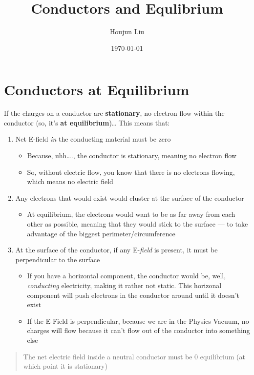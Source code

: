 \documentclass[letterpaper]{article}
\author{Houjun Liu}
\date{\today}
\title{Conductors and Equlibrium}
\renewcommand{\tableofcontents}{}
\begin{document}
\tableofcontents



\section{Conductors at Equilibrium}
\label{sec:orga47eebb}
If the charges on a conductor are \textbf{stationary}, no electron flow within
the conductor (so, it's \textbf{at equilibrium})\ldots{} This means that:

\begin{enumerate}
\item Net E-field \emph{in} the conducting material must be zero

\begin{itemize}
\item Because, uhh\ldots{}., the conductor is stationary, meaning no electron
flow
\item So, without electric flow, you know that there is no electrons
flowing, which means no electric field
\end{itemize}

\item Any electrons that would exist would cluster at the surface of the
conductor

\begin{itemize}
\item At equilibrium, the electrons would want to be as far away from
each other as possible, meaning that they would stick to the
surface --- to take advantage of the biggest
perimeter/circumference
\end{itemize}

\item At the surface of the conductor, if any E-\emph{field} is present, it must
be perpendicular to the surface

\begin{itemize}
\item If you have a horizontal component, the conductor would be, well,
\emph{conducting} electricity, making it rather not static. This
horizonal component will push electrons in the conductor around
until it doesn't exist
\item If the E-Field is perpendicular, because we are in the Physics
Vacuum, no charges will flow because it can't flow out of the
conductor into something else
\end{itemize}
\end{enumerate}

\begin{quote}
The net electric field inside a neutral conductor must be 0
equilibrium (at which point it is stationary)
\end{quote}
\end{document}
